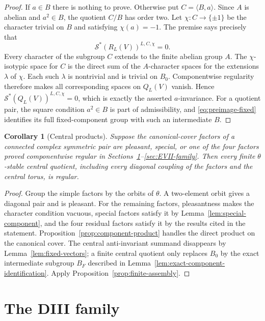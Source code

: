 \documentclass[11pt,reqno]{amsart}
\numberwithin{equation}{section}
\newtheorem{corollary}[theorem]{Corollary}
\theoremstyle{definition}
\theoremstyle{remark}
\newcommand{\cS}{\mathcal S}
\begin{document}
\begin{proof}
If $a\in B$ there is nothing to prove.  Otherwise put $C=\langle B,a\rangle$.
Since $A$ is abelian and $a^2\in B$, the quotient $C/B$ has order two.  Let
$\chi:C\to\{\pm1\}$ be the character trivial on $B$ and satisfying
$\chi(a)=-1$.  The premise says precisely that
\[
 \cS^*(R_L(V))^{L,C,\chi}=0.
\]
Every character of the subgroup $C$ extends to the finite abelian group $A$.
The $\chi$-isotypic space for $C$ is the direct sum of the $A$-character spaces
for the extensions $\lambda$ of $\chi$.  Each such $\lambda$ is nontrivial and
is trivial on $B_0$.  Componentwise regularity therefore makes all corresponding
spaces on $Q_L(V)$ vanish.  Hence
$\cS^*(Q_L(V))^{L,C,\chi}=0$, which is exactly the asserted $a$-invariance.
For a quotient pair, the square condition $a^2\in B$ is part of admissibility,
and \eqref{eq:preimage-fixed} identifies its full fixed-component group with
such an intermediate $B$.
\end{proof}

\begin{corollary}[Central products]\label{cor:central-products}
Suppose the canonical-cover factors of a connected complex symmetric pair are
pleasant, special, or one of the four factors proved componentwise regular in
Sections~\ref{sec:DIII-family}--\ref{sec:EVII-family}.  Then every finite
$\theta$-stable central quotient, including every diagonal coupling of the
factors and the central torus, is regular.
\end{corollary}

\begin{proof}
Group the simple factors by the orbits of $\theta$.  A two-element orbit gives
a diagonal pair and is pleasant.  For the remaining factors, pleasantness makes
the character condition vacuous, special factors satisfy it by
Lemma~\ref{lem:special-component}, and the four residual factors satisfy it by
the results cited in the statement.  Proposition~\ref{prop:component-product}
handles the direct product on the canonical cover.  The central anti-invariant
summand disappears by Lemma~\ref{lem:fixed-vectors}; a finite central quotient
only replaces $B_0$ by the exact intermediate subgroup $B_F$ described in
Lemma~\ref{lem:exact-component-identification}.  Apply
Proposition~\ref{prop:finite-assembly}.
\end{proof}

\section{The DIII family}\label{sec:DIII-family}
\end{document}
